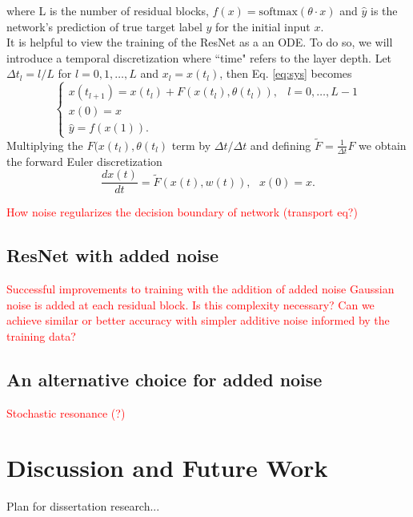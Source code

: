 \documentclass[12pt]{article}
\begin{document}
where L is the number of residual blocks, $f(x) = \text{softmax}(\theta \cdot x)$ and $\hat y$ is the network's prediction of true target label $y$ for the initial input $x$. \\
\indent It is helpful to view the training of the ResNet as a an ODE. To do so, we will introduce a temporal discretization where ``time" refers to the layer depth. Let $\Delta t_l = l/L$ for $l=0,1,\dots,L$ and $x_l = x(t_l)$, then Eq. \ref{eq:sys} becomes
\begin{equation} \begin{cases}
x(t_{l+1}) = x(t_l) + F(x(t_l),\theta(t_l)), & l=0,\dots,L-1 \\
x(0) = x \\
\hat y = f(x(1)).
\end{cases} \end{equation}
Multiplying the $F(x(t_l),\theta(t_l)$ term by $\Delta t/\Delta t$ and defining $\tilde{F} = \frac{1}{\Delta t} F$ we obtain the forward Euler discretization
\begin{equation}
  \dfrac{dx(t)}{dt} = \tilde{F}(x(t),w(t)),\text{   }  x(0) = x.
\end{equation}

\textcolor{red}{How noise regularizes the decision boundary of network (transport eq?)}
\subsection{ResNet with added noise}
\textcolor{red}{Successful improvements to training with the addition of added noise}
\textcolor{red}{Gaussian noise is added at each residual block. Is this complexity necessary? Can we achieve similar or better accuracy with simpler additive noise informed by the training data? }
\subsection{An alternative choice for added noise}
\textcolor{red}{Stochastic resonance (?)}
\section{Discussion and Future Work}
Plan for dissertation research...

\end{document}
